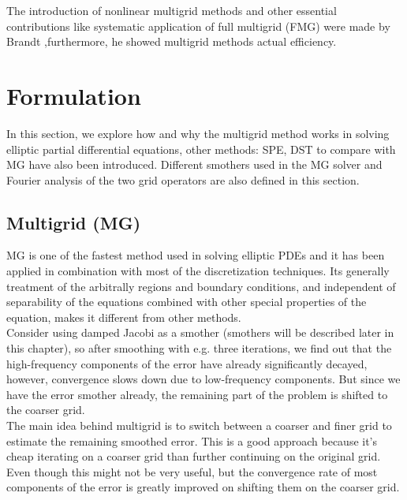 \documentclass[12pt,a4paper]{article}
\begin{document}
		\noindent The introduction of nonlinear multigrid methods and other essential contributions like systematic application of full multigrid (FMG) were made by Brandt \cite{brandt1977multi},furthermore, he showed multigrid methods actual efficiency.
	
	
	
	
	\section{Formulation}
	In this section, we explore how and why the multigrid method works in solving elliptic partial differential equations, other methods: SPE, DST to compare with MG have also been introduced. Different smothers used in the MG solver and Fourier analysis of the two grid operators are also defined in this section.
	\subsection{Multigrid (MG)}
	
	MG is one of the fastest method used in solving elliptic PDEs and it has been applied in combination with most of the discretization techniques.  Its generally treatment of the arbitrally regions and boundary conditions, and independent of separability of the equations combined with other special properties of the equation, makes it different from other methods.\\
	
		\noindent Consider using damped Jacobi as a smother (smothers will be described later in this chapter), so after smoothing with e.g. three iterations, we find out that the high-frequency components of the error have already significantly decayed, however, convergence slows down due to low-frequency components. But since we have the error smother already, the remaining part of the problem is shifted to the coarser grid.  \\
	 
		\noindent The main idea behind multigrid is to switch between a coarser and finer grid to estimate the remaining smoothed error. This is a good approach because it's cheap iterating on a coarser grid than further continuing on the original grid. Even though this might not be very useful, but the convergence rate of most components of the error is greatly improved on shifting them on the coarser grid.\\
	
\end{document}
